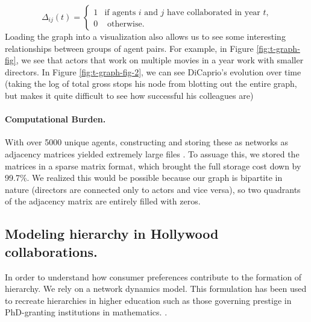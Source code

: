 \documentclass{article}
\begin{document}
\begin{equation}
    \Delta_{ij}(t) = \begin{cases} 1 & \text{if agents $i$ and $j$ have collaborated in year $t$,}\\
    0 & \text{ otherwise.}
    \end{cases}
\end{equation}
 Loading the graph into a visualization also allows us to see some interesting relationships between groups of agent pairs. For example, in Figure \ref{fig:t-graph-fig}, we see that actors that work on multiple movies in a year work with smaller directors. In Figure \ref{fig:t-graph-fig-2}, we can see DiCaprio's evolution over time (taking the log of total gross stops his node from blotting out the entire graph, but makes it quite difficult to see how successful his colleagues are)
 

\paragraph{Computational Burden.}
With over 5000 unique agents, constructing and storing these as networks as adjacency matrices yielded extremely large files . To assuage this, we stored the matrices in a sparse matrix format, which brought the full storage cost down by 99.7\%. We realized this would be possible because our graph is bipartite in nature (directors are connected only to actors and vice versa), so two quadrants of the adjacency matrix are entirely filled with zeros.

\subsection{Modeling hierarchy in Hollywood collaborations.}

In order to understand how consumer preferences contribute to the formation of hierarchy. We rely on a network dynamics model. This formulation has been used to recreate hierarchies in higher education such as those governing prestige in PhD-granting institutions in mathematics. \cite{Kawakatsu2020}.
\end{document}
